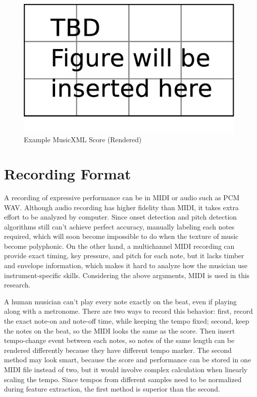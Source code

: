 \begin{figure}[tp]
   \begin{center}
      \includegraphics[width=\textwidth]{fig/TBDFigure}

   \end{center}
   \caption{Example MusicXML Score (Rendered)}
   \label{fig:expxmlrend}
\end{figure}

\section{Recording Format}
A recording of expressive performance can be in MIDI or audio such as PCM WAV. Although audio recording has higher fidelity than MIDI, it takes extra effort to be analyzed by computer. Since onset detection and pitch detection algorithms still can't achieve perfect accuracy, manually labeling each notes required, which will soon become impossible to do when the texture of music become polyphonic. On the other hand, a multichannel MIDI recording can provide exact timing, key pressure, and pitch for each note, but it lacks timber and envelope information, which makes it hard to analyze how the musician use instrument-specific skills. Considering the above arguments, MIDI is used in this research.

A human musician can't play every note exactly on the beat, even if playing along with a metronome. There are two ways to record this behavior: first, record the exact note-on and note-off time, while keeping the tempo fixed; second, keep the notes on the beat, so the MIDI looks the same as the score. Then insert tempo-change event between each notes, so notes of the same length can be rendered differently because they have different tempo marker. The second method may look smart, because the score and performance can be stored in one MIDI file instead of two, but it would involve complex calculation when linearly scaling the tempo. Since tempos from different samples need to be normalized during feature extraction, the first method is superior  than the second.

